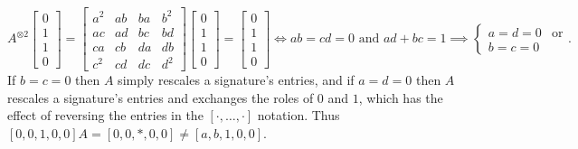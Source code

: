 \documentclass{theoretics}
\begin{document}
\[
    A^{\otimes 2}
    \begin{bmatrix} 0 \\ 1 \\ 1 \\ 0 \end{bmatrix} =
    \begin{bmatrix} 
        a^2 & ab & ba & b^2 \\
        ac & ad & bc & bd \\
        ca & cb & da & db \\
        c^2 & cd & dc & d^2
    \end{bmatrix}
    \begin{bmatrix} 0 \\ 1 \\ 1 \\ 0 \end{bmatrix}
    = \begin{bmatrix} 0 \\ 1 \\ 1 \\ 0 \end{bmatrix}
    \iff ab = cd = 0 \text{ and } ad + bc = 1
    \implies \begin{cases} a = d = 0 & \text{or} \\ b = c = 0\end{cases}.
\]
If $b=c=0$ then $A$ simply rescales a signature's entries, and if $a=d=0$ then
$A$ rescales a signature's entries and exchanges the roles of $0$ and $1$, which has the effect of
reversing the entries in the $[\cdot,\ldots,\cdot]$ notation. Thus $[0,0,1,0,0]A = [0,0,*,0,0]
\neq [a,b,1,0,0]$.
\end{document}

